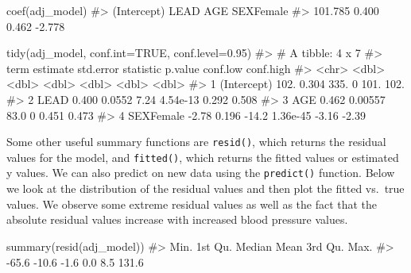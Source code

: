 \documentclass[
  letterpaper,
]{krantz}
\makeatletter
\newenvironment{Shaded}{\begin{snugshade}}{\end{snugshade}}
\newcommand{\AttributeTok}[1]{\textcolor[rgb]{0.40,0.45,0.13}{#1}}
\newcommand{\CommentTok}[1]{\textcolor[rgb]{0.37,0.37,0.37}{#1}}
\newcommand{\ConstantTok}[1]{\textcolor[rgb]{0.56,0.35,0.01}{#1}}
\newcommand{\FloatTok}[1]{\textcolor[rgb]{0.68,0.00,0.00}{#1}}
\newcommand{\FunctionTok}[1]{\textcolor[rgb]{0.28,0.35,0.67}{#1}}
\newcommand{\NormalTok}[1]{\textcolor[rgb]{0.00,0.23,0.31}{#1}}
\newenvironment{kframe}{%
\medskip{}
\setlength{\fboxsep}{.8em}
 \def\at@end@of@kframe{}%
 \ifinner\ifhmode%
  \def\at@end@of@kframe{\end{minipage}}%
  \begin{minipage}{\columnwidth}%
 \fi\fi%
 \def\FrameCommand##1{\hskip\@totalleftmargin \hskip-\fboxsep
 \colorbox{shadecolor}{##1}\hskip-\fboxsep
     \hskip-\linewidth \hskip-\@totalleftmargin \hskip\columnwidth}%
 \MakeFramed {\advance\hsize-\width
   \@totalleftmargin\z@ \linewidth\hsize
   \@setminipage}}%
 {\par\unskip\endMakeFramed%
 \at@end@of@kframe}
\renewenvironment{Shaded}{\begin{kframe}}{\end{kframe}}
\makeatother
\begin{document}
\begin{Shaded}
\begin{Highlighting}[]
\FunctionTok{coef}\NormalTok{(adj\_model)}
\CommentTok{\#\textgreater{} (Intercept)        LEAD         AGE   SEXFemale }
\CommentTok{\#\textgreater{}     101.785       0.400       0.462      {-}2.778}
\end{Highlighting}
\end{Shaded}

\begin{Shaded}
\begin{Highlighting}[]
\FunctionTok{tidy}\NormalTok{(adj\_model, }\AttributeTok{conf.int=}\ConstantTok{TRUE}\NormalTok{, }\AttributeTok{conf.level=}\FloatTok{0.95}\NormalTok{)}
\CommentTok{\#\textgreater{} \# A tibble: 4 x 7}
\CommentTok{\#\textgreater{}   term        estimate std.error statistic  p.value conf.low conf.high}
\CommentTok{\#\textgreater{}   \textless{}chr\textgreater{}          \textless{}dbl\textgreater{}     \textless{}dbl\textgreater{}     \textless{}dbl\textgreater{}    \textless{}dbl\textgreater{}    \textless{}dbl\textgreater{}     \textless{}dbl\textgreater{}}
\CommentTok{\#\textgreater{} 1 (Intercept)  102.      0.304      335.   0         101.      102.   }
\CommentTok{\#\textgreater{} 2 LEAD           0.400   0.0552       7.24 4.54e{-}13    0.292     0.508}
\CommentTok{\#\textgreater{} 3 AGE            0.462   0.00557     83.0  0           0.451     0.473}
\CommentTok{\#\textgreater{} 4 SEXFemale     {-}2.78    0.196      {-}14.2  1.36e{-}45   {-}3.16     {-}2.39}
\end{Highlighting}
\end{Shaded}

Some other useful summary functions are \texttt{resid()}, which returns
the residual values for the model, and \texttt{fitted()}, which returns
the fitted values or estimated y values. We can also predict on new data
using the \texttt{predict()} function. Below we look at the distribution
of the residual values and then plot the fitted vs.~true values. We
observe some extreme residual values as well as the fact that the
absolute residual values increase with increased blood pressure values.

\begin{Shaded}
\begin{Highlighting}[]
\FunctionTok{summary}\NormalTok{(}\FunctionTok{resid}\NormalTok{(adj\_model))}
\CommentTok{\#\textgreater{}    Min. 1st Qu.  Median    Mean 3rd Qu.    Max. }
\CommentTok{\#\textgreater{}   {-}65.6   {-}10.6    {-}1.6     0.0     8.5   131.6}
\end{Highlighting}
\end{Shaded}
\end{document}
